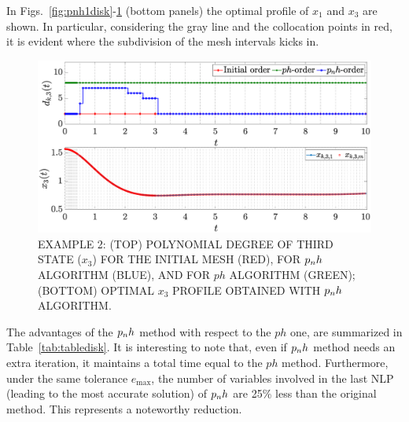 In Figs.~\ref{fig:pnh1disk}-\ref{fig:pnh2disk} (bottom panels) the optimal profile of $x_1$ and $x_3$ are shown. In particular, considering the gray line and the collocation points in red, it is evident where the subdivision of the mesh intervals kicks in.
\begin{figure}[t]
	\centering
	\includegraphics[trim={1cm 0.1cm 2cm 1.05cm},clip,width=1.\columnwidth]{Img/pnh2_disk2}
	\caption{EXAMPLE 2: (TOP) POLYNOMIAL DEGREE OF THIRD STATE ($x_{3}$) FOR THE INITIAL MESH (RED), FOR $p_{n}h$ ALGORITHM (BLUE), AND FOR $ph$ ALGORITHM (GREEN); (BOTTOM)
	OPTIMAL $x_3$ PROFILE OBTAINED WITH $p_{n}h$ ALGORITHM.}
	\label{fig:pnh2disk}
\end{figure}
The advantages of the $p_{n}h$ method with respect to the $ph$ one, are summarized in Table~\ref{tab:tabledisk}. It is interesting to note that, even if $p_{n}h$ method needs an extra iteration, it maintains a total time equal to the $ph$ method. Furthermore, under the same tolerance $e_{\max}$, the number of variables involved in the last NLP (leading to the most accurate solution) of $p_{n}h$ are 25\% less than the original method. This represents a noteworthy reduction.

